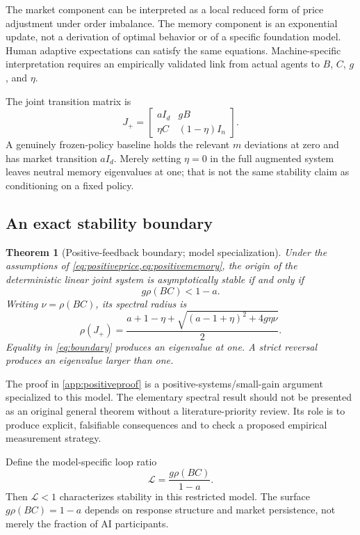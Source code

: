 \documentclass[11pt,a4paper]{article}
\newtheorem{theorem}{Theorem}[section]
\theoremstyle{definition}
\theoremstyle{remark}
\begin{document}
The market component can be interpreted as a local reduced form of price adjustment under order imbalance. The memory component is an exponential update, not a derivation of optimal behavior or of a specific foundation model. Human adaptive expectations can satisfy the same equations. Machine-specific interpretation requires an empirically validated link from actual agents to $B$, $C$, $g$, and $\eta$.

The joint transition matrix is
\begin{equation}
 J_+=\begin{bmatrix}aI_d&gB\\\eta C&(1-\eta)I_n\end{bmatrix}.
 \label{eq:Jpositive}
\end{equation}
A genuinely frozen-policy baseline holds the relevant $m$ deviations at zero and has market transition $aI_d$. Merely setting $\eta=0$ in the full augmented system leaves neutral memory eigenvalues at one; that is not the same stability claim as conditioning on a fixed policy.

\subsection{An exact stability boundary}
\begin{theorem}[Positive-feedback boundary; model specialization]
\label{thm:positive}
Under the assumptions of \cref{eq:positiveprice,eq:positivememory}, the origin of the deterministic linear joint system is asymptotically stable if and only if
\begin{equation}
 g\rho(BC)<1-a.
 \label{eq:boundary}
\end{equation}
Writing $\nu=\rho(BC)$, its spectral radius is
\begin{equation}
 \rho(J_+)=\frac{a+1-\eta+
 \sqrt{(a-1+\eta)^2+4g\eta\nu}}{2}.
 \label{eq:networkradius}
\end{equation}
Equality in \cref{eq:boundary} produces an eigenvalue at one. A strict reversal produces an eigenvalue larger than one.
\end{theorem}
The proof in \cref{app:positiveproof} is a positive-systems/small-gain argument specialized to this model. The elementary spectral result should not be presented as an original general theorem without a literature-priority review. Its role is to produce explicit, falsifiable consequences and to check a proposed empirical measurement strategy.

Define the model-specific loop ratio
\begin{equation}
 \mathcal L=\frac{g\rho(BC)}{1-a}.
 \label{eq:loopratio}
\end{equation}
Then $\mathcal L<1$ characterizes stability in this restricted model. The surface $g\rho(BC)=1-a$ depends on response structure and market persistence, not merely the fraction of AI participants.
\end{document}

